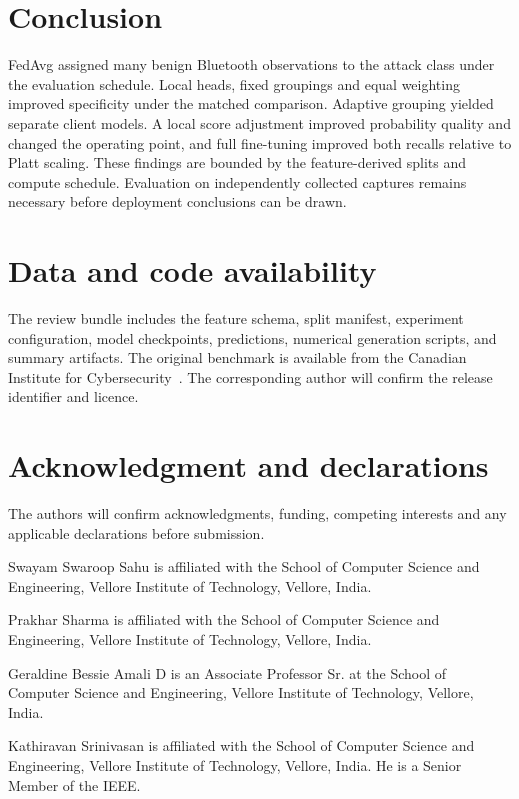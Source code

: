 \documentclass[nolineno]{ieeeaccess}
\begin{document}
\section{Conclusion}\label{sec:conclusion}
FedAvg assigned many benign Bluetooth observations to the attack class under the evaluation schedule. Local heads, fixed groupings and equal weighting improved specificity under the matched comparison. Adaptive grouping yielded separate client models. A local score adjustment improved probability quality and changed the operating point, and full fine-tuning improved both recalls relative to Platt scaling. These findings are bounded by the feature-derived splits and compute schedule. Evaluation on independently collected captures remains necessary before deployment conclusions can be drawn.

\section*{Data and code availability}
The review bundle includes the feature schema, split manifest, experiment configuration, model checkpoints, predictions, numerical generation scripts, and summary artifacts. The original benchmark is available from the Canadian Institute for Cybersecurity~\cite{dadkhah2024towards}. The corresponding author will confirm the release identifier and licence.

\section*{Acknowledgment and declarations}
The authors will confirm acknowledgments, funding, competing interests and any applicable declarations before submission.




\begin{IEEEbiography}[]{Swayam Swaroop Sahu}
is affiliated with the School of Computer Science and Engineering, Vellore Institute of Technology, Vellore, India.
\end{IEEEbiography}

\begin{IEEEbiography}[]{Prakhar Sharma}
is affiliated with the School of Computer Science and Engineering, Vellore Institute of Technology, Vellore, India.
\end{IEEEbiography}

\begin{IEEEbiography}[]{Geraldine Bessie Amali D}
is an Associate Professor Sr. at the School of Computer Science and Engineering, Vellore Institute of Technology, Vellore, India.
\end{IEEEbiography}

\begin{IEEEbiography}[]{Kathiravan Srinivasan}
is affiliated with the School of Computer Science and Engineering, Vellore Institute of Technology, Vellore, India. He is a Senior Member of the IEEE.
\end{IEEEbiography}

\EOD
\end{document}
